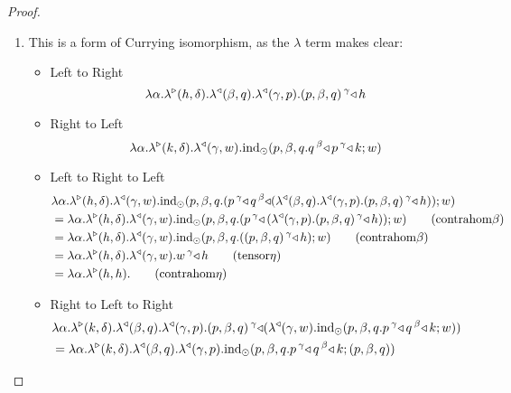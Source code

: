 \documentclass{llncs}
\begin{document}
\begin{proof}
  \begin{enumerate}
  \item This is a form of Currying isomorphism, as the $\lambda$ term
    makes clear:
    \begin{itemize}
    \item Left to Right
      \[ \lambdaunary \alpha h \delta \homllambdaXatYdotZ q \beta \homllambdaXatYdotZ p \gamma \homlappXtoYatZ h {(p,\beta,q)} \gamma  \]
    \item Right to Left
      \[ \lambdaunary {\alpha} k \delta \homllambdaXatYdotZ w \gamma \tensorelimWkontZ {w} {p,\beta,q. \homlappXtoYatZ {\homlappXtoYatZ k p \gamma} q \beta } \]
    \item Left to Right to Left
      \begin{align*}
        &\lambdaunary \alpha h \delta \homllambdaXatYdotZ w \gamma {\tensorelimWkontZ {w} {p,\beta,q. (\homlappXtoYatZ {\homlappXtoYatZ {(\homllambdaXatYdotZ q \beta \homllambdaXatYdotZ p \gamma {\homlappXtoYatZ h {(p,\beta,q)} \gamma})} q \beta }  p \gamma) }}\\
        &=\lambdaunary \alpha h \delta \homllambdaXatYdotZ w \gamma {\tensorelimWkontZ {w} {p,\beta,q. (\homlappXtoYatZ {{(\homllambdaXatYdotZ p \gamma {\homlappXtoYatZ h {(p,\beta,q)} \gamma})} }  p \gamma) }}\tag{contrahom$\beta$}\\
        &=\lambdaunary \alpha h \delta \homllambdaXatYdotZ w \gamma {\tensorelimWkontZ {w} {p,\beta,q. {{({\homlappXtoYatZ h {(p,\beta,q)} \gamma})} } }}\tag{contrahom$\beta$}\\
        &=\lambdaunary \alpha h \delta \homllambdaXatYdotZ w \gamma \homlappXtoYatZ h w \gamma\tag{tensor$\eta$}\\
        &=\lambdaunary \alpha h h\tag{contrahom$\eta$}
      \end{align*}
    \item Right to Left to Right
      \begin{align*}
        &\lambdaunary \alpha k \delta \homllambdaXatYdotZ q \beta \homllambdaXatYdotZ p \gamma \homlappXtoYatZ {(\homllambdaXatYdotZ w \gamma {\tensorelimWkontZ {w} {p,\beta,q. \homlappXtoYatZ {\homlappXtoYatZ k q \beta}  p \gamma }})} {(p,\beta,q)} \gamma\\
        &=\lambdaunary \alpha k \delta \homllambdaXatYdotZ q \beta \homllambdaXatYdotZ p \gamma { {\tensorelimWkontZ { {(p,\beta,q)}} {p,\beta,q. \homlappXtoYatZ {\homlappXtoYatZ k q \beta } p \gamma }}}\\

\end{align*}
\end{itemize}
\end{enumerate}
\end{proof}
\end{document}

